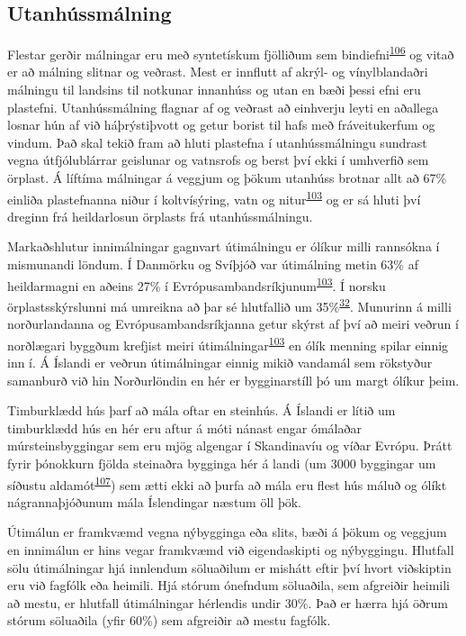\documentclass[icelandic,]{book}
\begin{document}
\hypertarget{utanhussmalning}{%
\subsection*{Utanhússmálning}\label{utanhussmalning}}

Flestar gerðir málningar eru með syntetískum fjölliðum sem bindiefni\textsuperscript{\protect\hyperlink{ref-Durkin2018}{106}} og vitað er að málning slitnar og veðrast. Mest er innflutt af akrýl- og vínylblandaðri málningu til landsins til notkunar innanhúss og utan en bæði þessi efni eru plastefni. Utanhússmálning flagnar af og veðrast að einhverju leyti en aðallega losnar hún af við háþrýstiþvott og getur borist til hafs með fráveitukerfum og vindum. Það skal tekið fram að hluti plastefna í utanhússmálningu sundrast vegna útfjólublárrar geislunar og vatnsrofs og berst því ekki í umhverfið sem örplast. Á líftíma málningar á veggjum og þökum utanhúss brotnar allt að 67\% einliða plastefnanna niður í koltvísýring, vatn og nitur\textsuperscript{\protect\hyperlink{ref-Hann2018}{103}} og er sá hluti því dreginn frá heildarlosun örplasts frá utanhússmálningu.

Markaðshlutur innimálningar gagnvart útimálningu er ólíkur milli rannsókna í mismunandi löndum. Í Danmörku og Svíþjóð var útimálning metin 63\% af heildarmagni en aðeins 27\% í Evrópusambandsríkjunum\textsuperscript{\protect\hyperlink{ref-Hann2018}{103}}. Í norsku örplastsskýrslunni má umreikna að þar sé hlutfallið um 35\%\textsuperscript{\protect\hyperlink{ref-sundt2014sources}{32}}. Munurinn á milli norðurlandanna og Evrópusambandsríkjanna getur skýrst af því að meiri veðrun í norðlægari byggðum krefjist meiri útimálningar\textsuperscript{\protect\hyperlink{ref-Hann2018}{103}} en ólík menning spilar einnig inn í. Á Íslandi er veðrun útimálningar einnig mikið vandamál sem rökstyður samanburð við hin Norðurlöndin en hér er bygginarstíll þó um margt ólíkur þeim.

Timburklædd hús þarf að mála oftar en steinhús. Á Íslandi er lítið um timburklædd hús en hér eru aftur á móti nánast engar ómálaðar múrsteinsbyggingar sem eru mjög algengar í Skandinavíu og víðar Evrópu. Þrátt fyrir þónokkurn fjölda steinaðra bygginga hér á landi (um 3000 byggingar um síðustu aldamót\textsuperscript{\protect\hyperlink{ref-Guuxf0mundsson2003}{107}}) sem ætti ekki að þurfa að mála eru flest hús máluð og ólíkt nágrannaþjóðunum mála Íslendingar næstum öll þök.

Útimálun er framkvæmd vegna nýbygginga eða slits, bæði á þökum og veggjum en innimálun er hins vegar framkvæmd við eigendaskipti og nýbyggingu. Hlutfall sölu útimálningar hjá innlendum söluaðilum er mishátt eftir því hvort viðskiptin eru við fagfólk eða heimili. Hjá stórum ónefndum söluaðila, sem afgreiðir heimili að mestu, er hlutfall útimálningar hérlendis undir 30\%. Það er hærra hjá öðrum stórum söluaðila (yfir 60\%) sem afgreiðir að mestu fagfólk.
\end{document}
